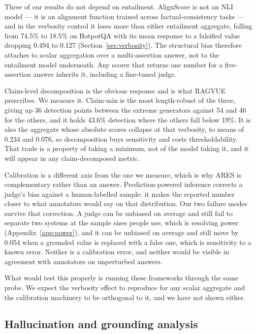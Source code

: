 \documentclass[11pt]{article}
\begin{document}
Three of our results do not depend on entailment. AlignScore is not an NLI model --- it is an alignment function trained across factual-consistency tasks --- and in the verbosity control it loses more than either entailment aggregate, falling from 74.5\% to 18.5\% on HotpotQA with its mean response to a falsified value dropping 0.494 to 0.127 (Section~\ref{sec:verbosity}). The structural bias therefore attaches to scalar aggregation over a multi-assertion answer, not to the entailment model underneath. Any scorer that returns one number for a five-assertion answer inherits it, including a fine-tuned judge.

Claim-level decomposition is the obvious response and is what RAGVUE prescribes. We measure it. Claim-min is the most length-robust of the three, giving up 36 detection points between the extreme generators against 54 and 46 for the others, and it holds 43.6\% detection where the others fall below 19\%. It is also the aggregate whose absolute scores collapse at that verbosity, to means of 0.234 and 0.076, so decomposition buys sensitivity and costs thresholdability. That trade is a property of taking a minimum, not of the model taking it, and it will appear in any claim-decomposed metric.

Calibration is a different axis from the one we measure, which is why ARES is complementary rather than an answer. Prediction-powered inference corrects a judge's bias against a human-labelled sample: it makes the reported number closer to what annotators would say on that distribution. Our two failure modes survive that correction. A judge can be unbiased on average and still fail to separate two systems at the sample sizes people use, which is resolving power (Appendix~\ref{app:power}), and it can be unbiased on average and still move by 0.054 when a grounded value is replaced with a false one, which is sensitivity to a known error. Neither is a calibration error, and neither would be visible in agreement with annotators on unperturbed answers.

What would test this properly is running these frameworks through the same probe. We expect the verbosity effect to reproduce for any scalar aggregate and the calibration machinery to be orthogonal to it, and we have not shown either.


\subsection{Hallucination and grounding analysis}
\label{sec:hallu}
\end{document}
